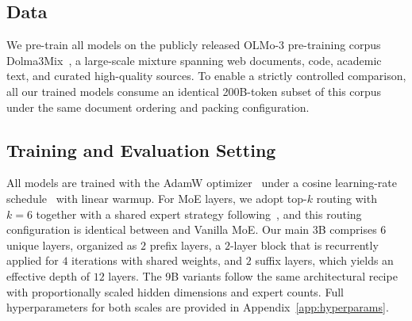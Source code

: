 \subsection{Data}
We pre-train all models on the publicly released OLMo-3 pre-training corpus Dolma3Mix~\citep{olmo2025olmo}, a large-scale mixture spanning web documents, code, academic text, and curated high-quality sources. To enable a strictly controlled comparison, all our trained models consume an identical 200B-token subset of this corpus under the same document ordering and packing configuration.

\subsection{Training and Evaluation Setting}
All models are trained with the AdamW optimizer~\cite{loshchilov2017decoupled} under a cosine learning-rate schedule~\cite{loshchilov2017sgdr} with linear warmup. For MoE layers, we adopt top-$k$ routing with $k{=}6$ together with a shared expert strategy following~\cite{dai2024deepseekmoe}, and this routing configuration is identical between \ourmodel and Vanilla MoE. Our main 3B \ourmodel comprises $6$ unique layers, organized as $2$ prefix layers, a $2$-layer block that is recurrently applied for $4$ iterations with shared weights, and $2$ suffix layers, which yields an effective depth of $12$ layers. The 9B variants follow the same architectural recipe with proportionally scaled hidden dimensions and expert counts. Full hyperparameters for both scales are provided in Appendix~\ref{app:hyperparams}.

